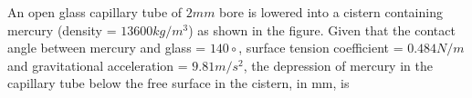 \iffalse
	\chapter{2015}
	\author{AI24BTECH11001}
	\section{xe}
\fi	
    \item An open glass capillary tube of $2 mm$ bore is lowered into a cistern containing mercury (density = $13600 kg/m^3$) as shown in the figure. Given that the contact angle between mercury and glass = $140\circ$, surface tension coefficient = $0.484 N/m$ and gravitational acceleration = $9.81 m/s^2$, the depression of mercury in the capillary tube below the free surface in the cistern, in mm, is

